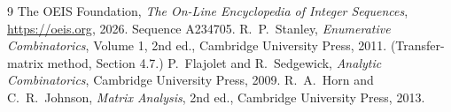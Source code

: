 \documentclass[11pt,a4paper]{article}
\theoremstyle{plain}
\theoremstyle{definition}
\begin{document}
\begin{thebibliography}{9}
 The OEIS Foundation, \emph{The On-Line Encyclopedia of Integer
Sequences}, \url{https://oeis.org}, 2026. Sequence A234705.
 R.~P.~Stanley, \emph{Enumerative Combinatorics}, Volume 1, 2nd ed.,
Cambridge University Press, 2011. (Transfer-matrix method, Section 4.7.)
 P.~Flajolet and R.~Sedgewick, \emph{Analytic Combinatorics}, Cambridge
University Press, 2009.
 R.~A.~Horn and C.~R.~Johnson, \emph{Matrix Analysis}, 2nd ed., Cambridge
University Press, 2013.
\end{thebibliography}
\end{document}

